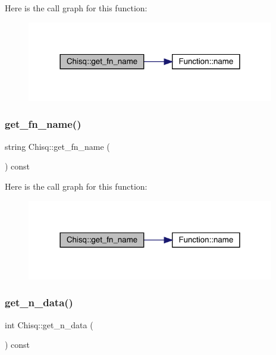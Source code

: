 Here is the call graph for this function\+:
\nopagebreak
\begin{figure}[H]
\begin{center}
\leavevmode
\includegraphics[width=306pt]{dd/da9/classChisq_a43f74965844bd0b1aa8a323e973728e6_cgraph}
\end{center}
\end{figure}
\mbox{\label{classChisq_a43f74965844bd0b1aa8a323e973728e6}} 
\subsubsection{\texorpdfstring{get\_fn\_name()}{get\_fn\_name()}\hspace{0.1cm}{\footnotesize\ttfamily [2/2]}}
{\footnotesize\ttfamily string Chisq\+::get\+\_\+fn\+\_\+name (\begin{DoxyParamCaption}{ }\end{DoxyParamCaption}) const\hspace{0.3cm}{\ttfamily [inline]}}

Here is the call graph for this function\+:
\nopagebreak
\begin{figure}[H]
\begin{center}
\leavevmode
\includegraphics[width=306pt]{dd/da9/classChisq_a43f74965844bd0b1aa8a323e973728e6_cgraph}
\end{center}
\end{figure}
\mbox{\label{classChisq_aab815b002c716da22d72ef225aa1bbec}} 
\subsubsection{\texorpdfstring{get\_n\_data()}{get\_n\_data()}\hspace{0.1cm}{\footnotesize\ttfamily [1/2]}}
{\footnotesize\ttfamily int Chisq\+::get\+\_\+n\+\_\+data (\begin{DoxyParamCaption}{ }\end{DoxyParamCaption}) const\hspace{0.3cm}{\ttfamily [inline]}}


